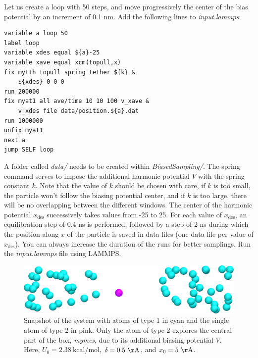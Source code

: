 \documentclass[9pt,tutorial]{livecoms}
\begin{document}
Let us create a loop with 50 steps, and move progressively the center of the bias potential by an increment of 0.1 nm. Add the following lines to \textit{input.lammps}:
{\normalsize \begin{verbatim}
variable a loop 50
label loop
variable xdes equal ${a}-25
variable xave equal xcm(topull,x)
fix mytth topull spring tether ${k} &
    ${xdes} 0 0 0
run 200000
fix myat1 all ave/time 10 10 100 v_xave &
    v_xdes file data/position.${a}.dat
run 1000000
unfix myat1
next a
jump SELF loop
\end{verbatim}}
A folder called \textit{data/} needs to be created within \textit{BiasedSampling/}. The spring command serves to impose the additional harmonic potential $V$ with the spring constant $k$. Note that the value of $k$ should be chosen with care, if $k$ is too small, the particle won't follow the biasing potential center, and if $k$ is too large, there will be no overlapping between the different windows. The center of the harmonic potential $x_\text{des}$ successively takes values from -25 to 25. For each value of $x_\text{des}$, an equilibration step of 0.4 ns is performed, followed by a step of 2 ns during which the position along $x$ of the particle is saved in data files (one data file per value of $x_\text{des}$). You can always increase the duration of the runs for better samplings. Run the \textit{input.lammps}  file using LAMMPS.

\begin{figure}
\centering
\includegraphics[width=\linewidth]{US-system-biased}
\caption{Snapshot of the system with atoms of type 1 in cyan and the single atom of type 2 in pink. Only the atom of type 2 explores the central part of the box, \textit{mymes}, due to its additional biasing potential $V$. Here, $U_0 = 2.38~\text{kcal/mol}$, $\delta = 0.5~\mathrm{\AA{}}$, and $x_0 = 5~\mathrm{\AA{}}$.}
\label{fig:US-system-biased}
\end{figure}
\end{document}
